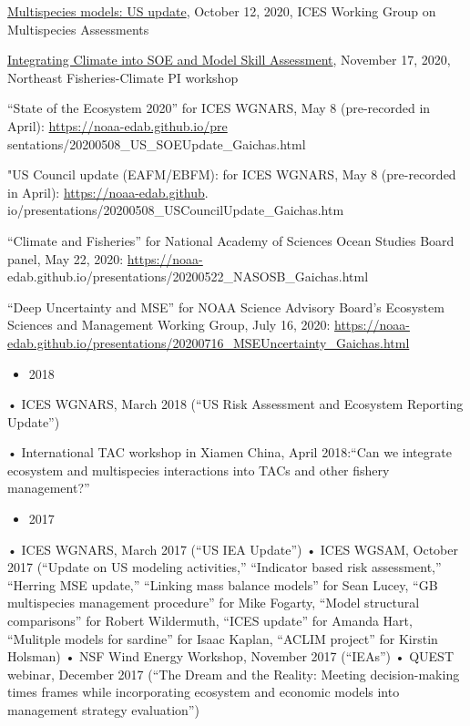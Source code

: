 \documentclass[11pt, a4paper]{awesome-cv}
\providecommand{\tightlist}{%
	\setlength{\itemsep}{0pt}\setlength{\parskip}{0pt}}
\begin{document}
\href{https://noaa-edab.github.io/presentations/20201012_WGSAM_USupdate_Gaichas.html\#1}{Multispecies
models: US update}, October 12, 2020, ICES Working Group on Multispecies
Assessments

\href{https://docs.google.com/presentation/d/184Af-afIIv-aGSRT6-Ed9SRmqf5n8YOO/edit\#slide=id.p1}{Integrating
Climate into SOE and Model Skill Assessment}, November 17, 2020,
Northeast Fisheries-Climate PI workshop

``State of the Ecosystem 2020'' for ICES WGNARS, May 8 (pre-recorded in
April): \url{https://noaa-edab.github.io/pre}
sentations/20200508\_US\_SOEUpdate\_Gaichas.html

"US Council update (EAFM/EBFM): for ICES WGNARS, May 8 (pre-recorded in
April): \url{https://noaa-edab.github}.
io/presentations/20200508\_USCouncilUpdate\_Gaichas.htm

``Climate and Fisheries'' for National Academy of Sciences Ocean Studies
Board panel, May 22, 2020: \url{https://noaa-}
edab.github.io/presentations/20200522\_NASOSB\_Gaichas.html

``Deep Uncertainty and MSE'' for NOAA Science Advisory Board's Ecosystem
Sciences and Management Working Group, July 16, 2020:
\url{https://noaa-edab.github.io/presentations/20200716_MSEUncertainty_Gaichas.html}

\begin{itemize}
\tightlist
\item
  2018
\end{itemize}

• ICES WGNARS, March 2018 (``US Risk Assessment and Ecosystem Reporting
Update'')

• International TAC workshop in Xiamen China, April 2018:``Can we
integrate ecosystem and multispecies interactions into TACs and other
fishery management?''

\begin{itemize}
\tightlist
\item
  2017
\end{itemize}

• ICES WGNARS, March 2017 (``US IEA Update'') • ICES WGSAM, October 2017
(``Update on US modeling activities,'' ``Indicator based risk
assessment,'' ``Herring MSE update,'' ``Linking mass balance models''
for Sean Lucey, ``GB multispecies management procedure'' for Mike
Fogarty, ``Model structural comparisons'' for Robert Wildermuth, ``ICES
update'' for Amanda Hart, ``Mulitple models for sardine'' for Isaac
Kaplan, ``ACLIM project'' for Kirstin Holsman) • NSF Wind Energy
Workshop, November 2017 (``IEAs'') • QUEST webinar, December 2017 (``The
Dream and the Reality: Meeting decision-making times frames while
incorporating ecosystem and economic models into management strategy
evaluation'')
\end{document}
